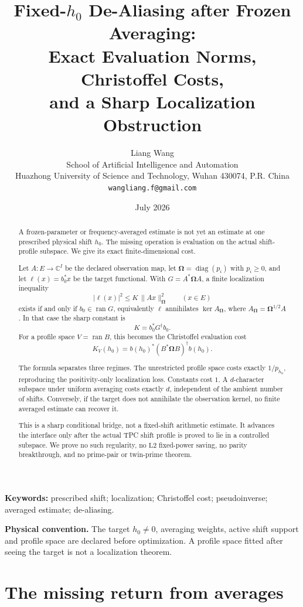 \documentclass[11pt]{article}
\title{\textbf{Fixed-\(h_0\) De-Aliasing after Frozen Averaging:}\\
Exact Evaluation Norms, Christoffel Costs,\\
and a Sharp Localization Obstruction}
\author{Liang Wang\\
School of Artificial Intelligence and Automation\\
Huazhong University of Science and Technology, Wuhan 430074, P.R. China\\
\texttt{wangliang.f@gmail.com}}
\date{July 2026}
\theoremstyle{definition}
\theoremstyle{remark}
\newcommand{\C}{\mathbb C}
\newcommand{\Ltwo}{\mathrm{L2}}
\newcommand{\Om}{\boldsymbol\Omega}
\begin{document}
\maketitle

\begin{abstract}
A frozen-parameter or frequency-averaged estimate is not yet an
estimate at one prescribed physical shift \(h_0\).  The missing
operation is evaluation on the actual shift-profile subspace.  We
give its exact finite-dimensional cost.

Let \(A:E\to\C^I\) be the declared observation map, let
\(\Om=\operatorname{diag}(p_i)\) with \(p_i\ge0\), and let
\(\ell(x)=b_0^*x\) be the target functional.  With
\(G=A^*\Om A\), a finite localization inequality
\[
 |\ell(x)|^2\le K\,\|Ax\|_{\Om}^2
 \qquad(x\in E)
\]
exists if and only if \(b_0\in\operatorname{ran}G\), equivalently
\(\ell\) annihilates \(\ker A_{\Om}\), where
\(A_{\Om}=\Om^{1/2}A\).  In that case the sharp constant is
\[
 \boxed{\qquad K=b_0^*G^\dagger b_0.\qquad}
\]
For a profile space \(V=\operatorname{ran}B\), this becomes the
Christoffel evaluation cost
\[
 K_V(h_0)=b(h_0)^*
  (B^*\Om B)^\dagger b(h_0).
\]

The formula separates three regimes.  The unrestricted profile space
costs exactly \(1/p_{h_0}\), reproducing the positivity-only
localization loss.  Constants cost \(1\).  A \(d\)-character subspace
under uniform averaging costs exactly \(d\), independent of the
ambient number of shifts.  Conversely, if the target does not
annihilate the observation kernel, no finite averaged estimate can
recover it.

This is a sharp conditional bridge, not a fixed-shift arithmetic
estimate.  It advances the interface only after the actual TPC shift
profile is proved to lie in a controlled subspace.  We prove no such
regularity, no \(\Ltwo\) fixed-power saving, no parity breakthrough,
and no prime-pair or twin-prime theorem.
\end{abstract}

\noindent\textbf{Keywords:}
prescribed shift; localization; Christoffel cost; pseudoinverse;
averaged estimate; de-aliasing.

\medskip
\noindent\textbf{Physical convention.}
The target \(h_0\ne0\), averaging weights, active shift support and
profile space are declared before optimization.  A profile space
fitted after seeing the target is not a localization theorem.

\section{The missing return from averages}
\end{document}

